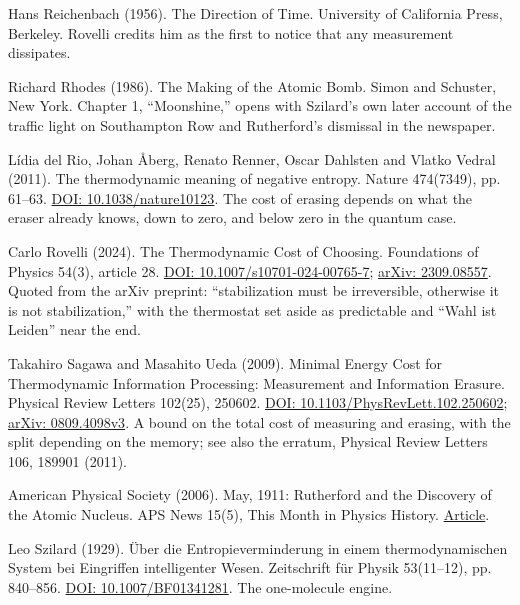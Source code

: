 \noindent Hans Reichenbach (1956). The Direction of Time. University of California Press, Berkeley. Rovelli credits him as the first to notice that any measurement dissipates.
\par\medskip

\noindent Richard Rhodes (1986). The Making of the Atomic Bomb. Simon and Schuster, New York. Chapter 1, ``Moonshine,'' opens with Szilard's own later account of the traffic light on Southampton Row and Rutherford's dismissal in the newspaper.
\par\medskip

\noindent L\'idia del Rio, Johan \AA{}berg, Renato Renner, Oscar Dahlsten and Vlatko Vedral (2011). The thermodynamic meaning of negative entropy. Nature 474(7349), pp. 61--63. \href{https://doi.org/10.1038/nature10123}{DOI: 10.1038/nature10123}. The cost of erasing depends on what the eraser already knows, down to zero, and below zero in the quantum case.
\par\medskip

\noindent Carlo Rovelli (2024). The Thermodynamic Cost of Choosing. Foundations of Physics 54(3), article 28. \href{https://doi.org/10.1007/s10701-024-00765-7}{DOI: 10.1007/s10701-024-00765-7}; \href{https://arxiv.org/abs/2309.08557}{arXiv: 2309.08557}. Quoted from the arXiv preprint: ``stabilization must be irreversible, otherwise it is not stabilization,'' with the thermostat set aside as predictable and ``Wahl ist Leiden'' near the end.
\par\medskip

\noindent Takahiro Sagawa and Masahito Ueda (2009). Minimal Energy Cost for Thermodynamic Information Processing: Measurement and Information Erasure. Physical Review Letters 102(25), 250602. \href{https://doi.org/10.1103/PhysRevLett.102.250602}{DOI: 10.1103/PhysRevLett.102.250602}; \href{https://arxiv.org/abs/0809.4098v3}{arXiv: 0809.4098v3}. A bound on the total cost of measuring and erasing, with the split depending on the memory; see also the erratum, Physical Review Letters 106, 189901 (2011).
\par\medskip

\noindent American Physical Society (2006). May, 1911: Rutherford and the Discovery of the Atomic Nucleus. APS News 15(5), This Month in Physics History. \href{https://www.aps.org/publications/apsnews/200605/history.cfm}{Article}.
\par\medskip

\noindent Leo Szilard (1929). \"Uber die Entropieverminderung in einem thermodynamischen System bei Eingriffen intelligenter Wesen. Zeitschrift f\"ur Physik 53(11--12), pp. 840--856. \href{https://doi.org/10.1007/BF01341281}{DOI: 10.1007/BF01341281}. The one-molecule engine.
\par\medskip

